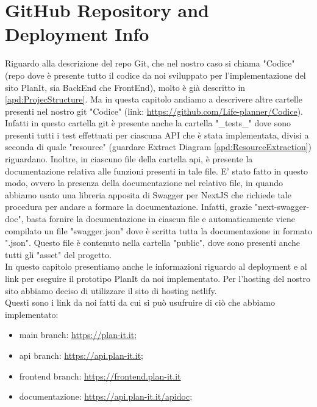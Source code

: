 \section{GitHub Repository and Deployment Info}
\label{secD4:GitHubRepositoryAndDeploymentInfo}
Riguardo alla descrizione del repo Git, che nel nostro caso si chiama "Codice" (repo dove è presente tutto il codice da noi sviluppato per l'implementazione del sito PlanIt, sia BackEnd che FrontEnd), molto è già descritto in \ref{apd:ProjecStructure}. Ma in questa capitolo andiamo a descrivere altre cartelle presenti nel nostro git "Codice" (link: \href{https://github.com/Life-planner/Codice} {https://github.com/Life-planner/Codice}). Infatti in questo cartella git è presente anche la cartella "\_tests\_" dove sono presenti tutti i test effettuati per ciascuna API che è stata implementata, divisi a seconda di quale "resource" (guardare Extract Diagram \ref{apd:ResourceExtraction}) riguardano. Inoltre, in  ciascuno file della cartella api, è presente la documentazione relativa alle funzioni presenti in tale file. E' stato fatto in questo modo, ovvero la presenza della documentazione nel relativo file, in quando abbiamo usato una libreria apposita di Swagger per NextJS che richiede tale procedura per andare a formare la documentazione. Infatti, grazie "next-swagger-doc", basta fornire la documentazione in ciascun file e automaticamente viene compilato un file "swagger.json" dove è scritta tutta la documentazione in formato ".json". Questo file è contenuto nella cartella "public", dove sono presenti anche tutti gli "asset" del progetto.\\
In questo capitolo presentiamo anche le informazioni riguardo al deployment e al link per eseguire il prototipo PlanIt da noi implementato. Per l'hosting del nostro sito abbiamo deciso di utilizzare il sito di hosting netlify. \\ Questi sono i link da noi fatti da cui si può usufruire di ciò che abbiamo implementato:
\begin{itemize}
    \item main branch: \href{https://plan-it.it} {https://plan-it.it};
    \item api branch: \href{https://api.plan-it.it} {https://api.plan-it.it};
    \item frontend branch: \href{https://frontend.plan-it.it} {https://frontend.plan-it.it}
    \item documentazione: \href{https://api.plan-it.it/apidoc} {https://api.plan-it.it/apidoc};

\end{itemize}
